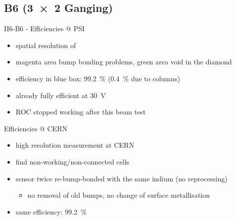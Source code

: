 \subsection{B6 (\SI{3x2}{} Ganging)}
\begin{frame}{II6-B6 - Efficiencies @ PSI}

	
	\begin{itemize}\itemfill
		\item spatial resolution of 
		\item magenta area \ra bump bonding problems, green area \ra void in the diamond
		\item efficiency in blue box: \SI{99.2}{\%} (\ra \SI{.4}{\%} due to columns)
		\item already fully efficient at \SI{30}{\volt}
		\item ROC stopped working after this beam test
	\end{itemize}
	
\end{frame}
% 
% 	
% 	
\begin{frame}{Efficiencies @ CERN}

	\vspace*{-2ex}\vspace*{-2ex}
	
	\begin{itemize}\itemfill
		\item high resolution measurement at CERN
		\item find non-working/non-connected cells
		\item sensor twice re-bump-bonded with the same indium (no reprocessing)
		\begin{itemize}
			\item no removal of old bumps, no change of surface metallisation
		\end{itemize}
		\item same efficiency: \SI{99.2}{\%}
	\end{itemize}
	
\end{frame}
